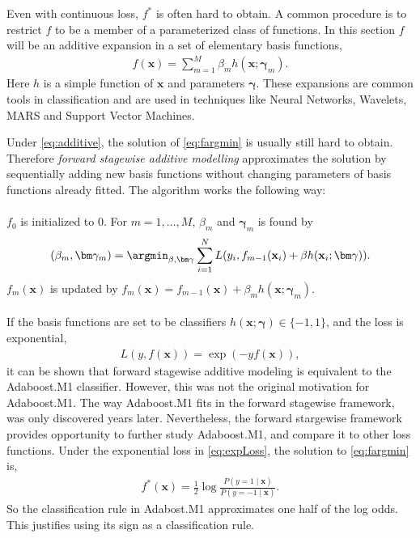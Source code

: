 Even with continuous loss, $f^*$ is often hard to obtain. A common procedure is to restrict $f$ to be a member of a parameterized class of functions. In this section $f$ will be an additive expansion in a set of elementary basis functions,
\begin{align}
  \label{eq:additive} 
  f(\mathbf{x}) =  \sum^{M}_{m=1} \beta_m h(\mathbf{x}; \bm{\gamma}_m).
\end{align}
Here $h$ is a simple function of $\mathbf{x}$ and parameters $\bm{\gamma}$. These expansions are common tools in classification and are used in techniques like Neural Networks, Wavelets, MARS and Support Vector Machines.

Under \eqref{eq:additive}, the solution of \eqref{eq:fargmin} is usually still hard to obtain. Therefore \textit{forward stagewise additive modelling} approximates the solution by sequentially adding new basis functions without changing parameters of basis functions already fitted. The algorithm works the following way:\\
\\
$f_0$ is initialized to 0. For $m = 1, \ldots, M$, $\beta_m$ and $\bm \gamma_m$ is found by
\begin{align}
  \label{eq:forStageWise} 
  (\beta_m, \bm \gamma_m) = \argmin_{\beta, \bm \gamma} \sum^{N}_{i=1} L(y_i, f_{m-1}(\mathbf{x}_i) + \beta h(\mathbf{x}_i; \bm \gamma)).
\end{align}
$f_m(\mathbf{x})$ is updated by $f_m(\mathbf{x}) = f_{m-1}(\mathbf{x}) + \beta_m h(\mathbf{x}; \bm \gamma_m)$.\\
\\
If the basis functions are set to be classifiers $h(\mathbf{x}; \bm \gamma) \in \{-1, 1\}$, and the loss is exponential,
\begin{align}
  \label{eq:expLoss} 
  L(y, f(\mathbf{x})) = \exp (-y f(\mathbf{x})),
\end{align}
it can be shown \citep{modstat} that forward stagewise additive modeling is equivalent to the Adaboost.M1 classifier. However, this was not the original motivation for Adaboost.M1. The way Adaboost.M1 fits in the forward stagewise framework, was only discovered years later. Nevertheless, the forward stargewise framework provides opportunity to further study Adaboost.M1, and compare it to other loss functions. Under the exponential loss in \eqref{eq:expLoss}, the solution to \eqref{eq:fargmin} is,
\begin{align}
  f^*( \mathbf{x}) = \frac{1}{2} \log \frac{P(y=1 \mid \mathbf{x})}{P(y=-1 \mid \mathbf{x})} .
\end{align}
So the classification rule in Adabost.M1 approximates one half of the log odds. This justifies using its sign as a classification rule.
%
